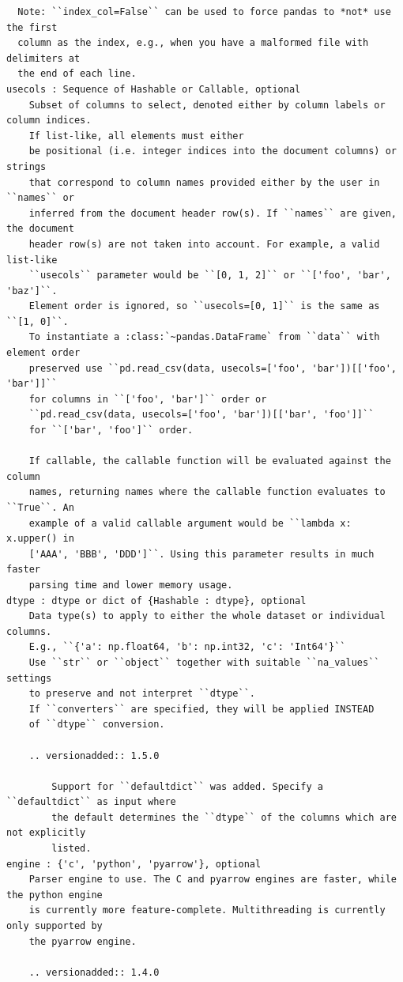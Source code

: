 \documentclass[
  letterpaper,
  DIV=11,
  numbers=noendperiod]{scrreprt}
\begin{document}
\begin{verbatim}
  Note: ``index_col=False`` can be used to force pandas to *not* use the first
  column as the index, e.g., when you have a malformed file with delimiters at
  the end of each line.
usecols : Sequence of Hashable or Callable, optional
    Subset of columns to select, denoted either by column labels or column indices.
    If list-like, all elements must either
    be positional (i.e. integer indices into the document columns) or strings
    that correspond to column names provided either by the user in ``names`` or
    inferred from the document header row(s). If ``names`` are given, the document
    header row(s) are not taken into account. For example, a valid list-like
    ``usecols`` parameter would be ``[0, 1, 2]`` or ``['foo', 'bar', 'baz']``.
    Element order is ignored, so ``usecols=[0, 1]`` is the same as ``[1, 0]``.
    To instantiate a :class:`~pandas.DataFrame` from ``data`` with element order
    preserved use ``pd.read_csv(data, usecols=['foo', 'bar'])[['foo', 'bar']]``
    for columns in ``['foo', 'bar']`` order or
    ``pd.read_csv(data, usecols=['foo', 'bar'])[['bar', 'foo']]``
    for ``['bar', 'foo']`` order.

    If callable, the callable function will be evaluated against the column
    names, returning names where the callable function evaluates to ``True``. An
    example of a valid callable argument would be ``lambda x: x.upper() in
    ['AAA', 'BBB', 'DDD']``. Using this parameter results in much faster
    parsing time and lower memory usage.
dtype : dtype or dict of {Hashable : dtype}, optional
    Data type(s) to apply to either the whole dataset or individual columns.
    E.g., ``{'a': np.float64, 'b': np.int32, 'c': 'Int64'}``
    Use ``str`` or ``object`` together with suitable ``na_values`` settings
    to preserve and not interpret ``dtype``.
    If ``converters`` are specified, they will be applied INSTEAD
    of ``dtype`` conversion.

    .. versionadded:: 1.5.0

        Support for ``defaultdict`` was added. Specify a ``defaultdict`` as input where
        the default determines the ``dtype`` of the columns which are not explicitly
        listed.
engine : {'c', 'python', 'pyarrow'}, optional
    Parser engine to use. The C and pyarrow engines are faster, while the python engine
    is currently more feature-complete. Multithreading is currently only supported by
    the pyarrow engine.

    .. versionadded:: 1.4.0


\end{verbatim}
\end{document}

